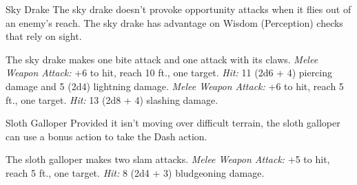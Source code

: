 \documentclass[10pt,a4paper,twoside,twocolumn,openany,bg=print,nodeprecatedcode]{dndbook}
\begin{document}
\begin{DndMonster}[float*=t]{Sky Drake}
\DndMonsterBasics[
armor-class = {14 (natural armor)},
hit-points = {\DndDice{10d10 + 30}},
speed = {20 ft., 60 ft. (key)}
]
\DndMonsterAbilityScores[
 str = 18,
 dex = 11,
 con = 17,
 int = 8,
 wis = 14,
 cha = 11
]
\DndMonsterDetails[
skills = {Athletics +6, Perception +4, Survival +4},
senses = {darkvision 120 ft., passive perception 14},
languages = {Draconic and one other language},
challenge = 4,
]
The sky drake doesn't provoke opportunity attacks when it flies out of an enemy's reach.
The sky drake has advantage on Wisdom (Perception) checks that rely on sight.
\par
{}
The sky drake makes one bite attack and one attack with its claws.
\textsl{Melee Weapon Attack:} +6 to hit, reach 10 ft., one target. \textsl{Hit:} 11 (2d6 + 4) piercing damage and 5 (2d4) lightning damage.
\textsl{Melee Weapon Attack:} +6 to hit, reach 5 ft., one target. \textsl{Hit:} 13 (2d8 + 4) slashing damage.
\end{DndMonster}


\clearpage

\begin{DndMonster}[float*=t]{Sloth Galloper}
\DndMonsterBasics[
armor-class = {11},
hit-points = {\DndDice{4d10 + 4}},
speed = {25 ft., 25 ft. (key)}
]
\DndMonsterAbilityScores[
 str = 17,
 dex = 13,
 con = 12,
 int = 4,
 wis = 12,
 cha = 7
]
\DndMonsterDetails[
senses = {darkvision 60 ft., passive perception 11},
challenge = 1,
]
Provided it isn't moving over difficult terrain, the sloth galloper can use a bonus action to take the Dash action.
\par
{}
The sloth galloper makes two slam attacks.
\textsl{Melee Weapon Attack:} +5 to hit, reach 5 ft., one target. \textsl{Hit:} 8 (2d4 + 3) bludgeoning damage.
\end{DndMonster}
\end{document}
